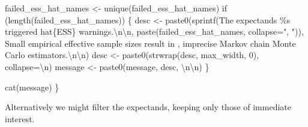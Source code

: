 \documentclass[
  letterpaper,
  DIV=11,
  numbers=noendperiod]{scrartcl}
\newenvironment{Shaded}{\begin{snugshade}}{\end{snugshade}}
\newcommand{\CharTok}[1]{\textcolor[rgb]{0.13,0.47,0.30}{#1}}
\newcommand{\ControlFlowTok}[1]{\textcolor[rgb]{0.00,0.23,0.31}{#1}}
\newcommand{\DecValTok}[1]{\textcolor[rgb]{0.68,0.00,0.00}{#1}}
\newcommand{\NormalTok}[1]{\textcolor[rgb]{0.00,0.23,0.31}{#1}}
\newcommand{\OperatorTok}[1]{\textcolor[rgb]{0.37,0.37,0.37}{#1}}
\newcommand{\SpecialCharTok}[1]{\textcolor[rgb]{0.37,0.37,0.37}{#1}}
\newcommand{\StringTok}[1]{\textcolor[rgb]{0.13,0.47,0.30}{#1}}
\begin{document}
\begin{Shaded}
\begin{Highlighting}[]
\NormalTok{  failed\_ess\_hat\_names }\OperatorTok{\textless{}{-}}\NormalTok{ unique(failed\_ess\_hat\_names)}
  \ControlFlowTok{if}\NormalTok{ (length(failed\_ess\_hat\_names)) \{}
\NormalTok{    desc }\OperatorTok{\textless{}{-}} 
\NormalTok{      paste0(sprintf(}\StringTok{\textquotesingle{}The expectands }\SpecialCharTok{\%s}\StringTok{ triggered hat}\SpecialCharTok{\{ESS\}}\StringTok{ warnings.}\CharTok{\textbackslash{}n\textbackslash{}n}\StringTok{\textquotesingle{}}\NormalTok{,}
\NormalTok{             paste(failed\_ess\_hat\_names, collapse}\OperatorTok{=}\StringTok{", "}\NormalTok{)),}
             \StringTok{\textquotesingle{}Small empirical effective sample sizes result in \textquotesingle{}}\NormalTok{,}
             \StringTok{\textquotesingle{}imprecise Markov chain Monte Carlo estimators.}\CharTok{\textbackslash{}n\textbackslash{}n}\StringTok{\textquotesingle{}}\NormalTok{)}
\NormalTok{    desc }\OperatorTok{\textless{}{-}}\NormalTok{ paste0(strwrap(desc, max\_width, }\DecValTok{0}\NormalTok{), collapse}\OperatorTok{=}\StringTok{\textquotesingle{}}\CharTok{\textbackslash{}n}\StringTok{\textquotesingle{}}\NormalTok{)}
\NormalTok{    message }\OperatorTok{\textless{}{-}}\NormalTok{ paste0(message, desc, }\StringTok{\textquotesingle{}}\CharTok{\textbackslash{}n\textbackslash{}n}\StringTok{\textquotesingle{}}\NormalTok{)}
\NormalTok{  \}}
  
\NormalTok{  cat(message)}
\NormalTok{\}}
\end{Highlighting}
\end{Shaded}

Alternatively we might filter the expectands, keeping only those of
immediate interest.
\end{document}
